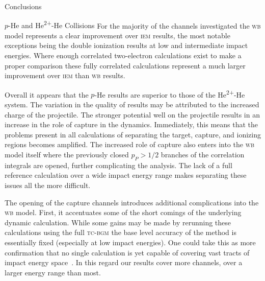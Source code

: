 \documentclass[letterpaper, 11 pt]{report}
\begin{document}
\begin{chapter}{Conclusions \label{chap:con}}
\begin{section}{\texorpdfstring{$p$}{p}-He and \texorpdfstring{He\textsuperscript{2+}}{He2+}-He
                   Collisions \label{sec:con-phe2p-he}}
      For the majority of the channels investigated the \textsc{wb} model represents a clear improvement
      over \textsc{iem}  results, the most notable exceptions being the double ionization results at low
      and intermediate impact energies. Where enough correlated two-electron calculations exist to make
      a proper comparison these fully correlated calculations represent a much larger improvement over
      \textsc{iem} than \textsc{wb} results.

      Overall it appears that the $p$-He results are superior to those of the He\textsuperscript{2+}-He
      system. The variation in the quality of results may be attributed to the increased charge of the
      projectile. The stronger potential well on the projectile results in an increase in the role of
      capture in the dynamics. Immediately, this means that the problems present in all calculations of
      separating the target, capture, and ionizing regions becomes amplified. The increased role of
      capture also enters into the \textsc{wb} model itself where the previously closed $p_P > 1/2$
      branches of the correlation integrals are opened, further complicating the analysis. The lack of a
      full reference calculation over a wide impact energy range makes separating these issues all the
      more difficult.

      The opening of the capture channels introduces additional complications into the \textsc{wb}
      model. First, it accentuates some of the short comings of the underlying dynamic calculation.
      While some gains may be made by rerunning these calculations using the full \textsc{tc-bgm} the
      base level accuracy of the method is essentially fixed (especially at low impact energies). One
      could take this as more confirmation that no single calculation is yet capable of covering vast
      tracts of impact energy space~\cite{LRV-14}. In this regard our results cover more channels, over
      a larger energy range than most.


\end{section}
\end{chapter}
\end{document}
